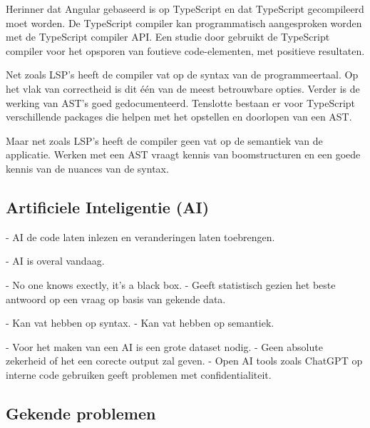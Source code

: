 Herinner dat Angular gebaseerd is op TypeScript en dat TypeScript gecompileerd moet worden.
De TypeScript compiler kan programmatisch aangesproken worden met de TypeScript compiler API.
Een studie door \textcite{Reid2023} gebruikt de TypeScript compiler voor het opsporen van foutieve code-elementen, met positieve resultaten.

Net zoals LSP's heeft de compiler vat op de syntax van de programmeertaal.
Op het vlak van correctheid is dit één van de meest betrouwbare opties.
Verder is de werking van AST's goed gedocumenteerd.
Tenslotte bestaan er voor TypeScript verschillende packages die helpen met het opstellen en doorlopen van een AST.

Maar net zoals LSP's heeft de compiler geen vat op de semantiek van de applicatie.
Werken met een AST vraagt kennis van boomstructuren en een goede kennis van de nuances van de syntax.

\subsection{Artificiele Inteligentie (AI)}
\label{ch:stand-van-zaken:refactoring:ai}


- AI de code laten inlezen en veranderingen laten toebrengen.


- AI is overal vandaag.


- No one knows exectly, it's a black box.
- Geeft statistisch gezien het beste antwoord op een vraag op basis van gekende data.


- Kan vat hebben op syntax.
- Kan vat hebben op semantiek.


- Voor het maken van een AI is een grote dataset nodig.
- Geen absolute zekerheid of het een corecte output zal geven.
- Open AI tools zoals ChatGPT op interne code gebruiken geeft problemen met confidentialiteit.

\subsection{Gekende problemen}
\label{ch:stand-van-zaken:refactoring:known-problems}

